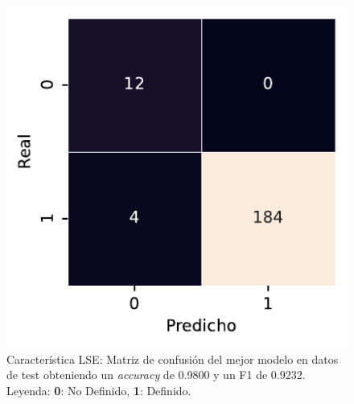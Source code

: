 \begin{figure}[htbp]
    \vspace{1.5em} %

    \includegraphics[width=0.6\linewidth]{figures/5_experiments/single-lse-cm.pdf}
    \caption[Característica LSE: Matriz de confusión del mejor modelo en datos de test.]{Característica LSE: Matriz de confusión del mejor modelo en datos de test obteniendo un \textit{accuracy} de 0.9800 y un F1 de 0.9232. Leyenda: \textbf{0}: No Definido, \textbf{1}: Definido.}
    \label{fig5:LSE_confusion_matrix}
\end{figure}

